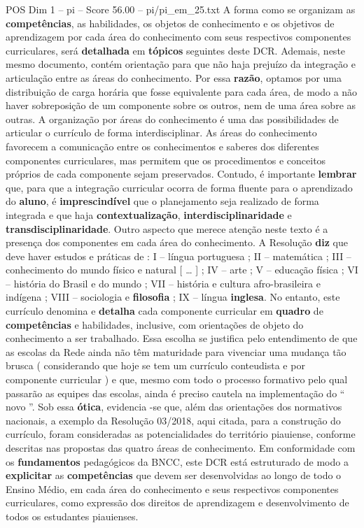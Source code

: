 \begin{textsample}{POS Dim 1 – pi – Score 56.00 – pi/pi\_em\_25.txt}
A forma como se organizam as \textbf{competências}, as habilidades, os objetos de conhecimento e os objetivos de aprendizagem por cada área do conhecimento com seus respectivos componentes curriculares, será \textbf{detalhada} em \textbf{tópicos} seguintes deste DCR.
Ademais, neste mesmo documento, contém orientação para que não haja prejuízo da integração e articulação entre as áreas do conhecimento.
Por essa \textbf{razão}, optamos por uma distribuição de carga horária que fosse equivalente para cada área, de modo a não haver sobreposição de um componente sobre os outros, nem de uma área sobre as outras.
A organização por áreas do conhecimento é uma das possibilidades de articular o currículo de forma interdisciplinar.
As áreas do conhecimento favorecem a comunicação entre os conhecimentos e saberes dos diferentes componentes curriculares, mas permitem que os procedimentos e conceitos próprios de cada componente sejam preservados.
Contudo, é importante \textbf{lembrar} que, para que a integração curricular ocorra de forma fluente para o aprendizado do \textbf{aluno}, é \textbf{imprescindível} que o planejamento seja realizado de forma integrada e que haja \textbf{contextualização}, \textbf{interdisciplinaridade} e \textbf{transdisciplinaridade}.
Outro aspecto que merece atenção neste texto é a presença dos componentes em cada área do conhecimento.
A Resolução \textbf{diz} que deve haver estudos e práticas de : I – língua portuguesa ; II – matemática ; III – conhecimento do mundo físico e natural [ … ] ; IV – arte ; V – educação física ; VI – história do Brasil e do mundo ; VII – história e cultura afro-brasileira e indígena ; VIII – sociologia e \textbf{filosofia} ; IX – língua \textbf{inglesa}.
No entanto, este currículo denomina e \textbf{detalha} cada componente curricular em \textbf{quadro} de \textbf{competências} e habilidades, inclusive, com orientações de objeto do conhecimento a ser trabalhado.
Essa escolha se justifica pelo entendimento de que as escolas da Rede ainda não têm maturidade para vivenciar uma mudança tão brusca ( considerando que hoje se tem um currículo conteudista e por componente curricular ) e que, mesmo com todo o processo formativo pelo qual passarão as equipes das escolas, ainda é preciso cautela na implementação do “ novo ”.
Sob essa \textbf{ótica}, evidencia -se que, além das orientações dos normativos nacionais, a exemplo da Resolução 03/2018, aqui citada, para a construção do currículo, foram consideradas as potencialidades do território piauiense, conforme descritas nas propostas das quatro áreas de conhecimento.
Em conformidade com os \textbf{fundamentos} pedagógicos da BNCC, este DCR está estruturado de modo a \textbf{explicitar} as \textbf{competências} que devem ser desenvolvidas ao longo de todo o Ensino Médio, em cada área do conhecimento e seus respectivos componentes curriculares, como expressão dos direitos de aprendizagem e desenvolvimento de todos os estudantes piauienses.

\end{textsample}

